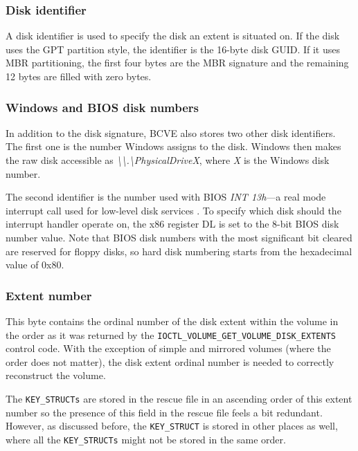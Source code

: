 \documentclass[thesis=B,english]{FITthesis}[2012/10/20]
\begin{document}
	\subsubsection{Disk identifier}
	
	A disk identifier is used to specify the disk an extent is situated on. If the disk uses the GPT partition style, the identifier is the 16-byte disk GUID. If it uses MBR partitioning, the first four bytes are the MBR signature and the remaining 12 bytes are filled with zero bytes.
	
	\subsubsection{Windows and BIOS disk numbers}
	
	In addition to the disk signature, BCVE also stores two other disk identifiers. The first one is the number Windows assigns to the disk. Windows then makes the raw disk accessible as \textit{\textbackslash\textbackslash.\textbackslash{}PhysicalDriveX}, where \textit{X} is the Windows disk number. 
	
	The second identifier is the number used with BIOS \textit{INT 13h}---a real mode interrupt call used for low-level disk services \cite{int13}. To specify which disk should the interrupt handler operate on, the x86 register DL is set to the 8-bit BIOS disk number value. Note that BIOS disk numbers with the most significant bit cleared are reserved for floppy disks, so hard disk numbering starts from the hexadecimal value of 0x80.
	
	\subsubsection{Extent number}
	
	This byte contains the ordinal number of the disk extent within the volume in the order as it was returned by the \verb|IOCTL_VOLUME_GET_VOLUME_DISK_EXTENTS| control code. With the exception of simple and mirrored volumes (where the order does not matter), the disk extent ordinal number is needed to correctly reconstruct the volume.
	
	The \verb|KEY_STRUCTs| are stored in the rescue file in an ascending order of this extent number so the presence of this field in the rescue file feels a bit redundant. However, as discussed before, the \verb|KEY_STRUCT| is stored in other places as well, where all the \verb|KEY_STRUCTs| might not be stored in the same order.
	
\end{document}
